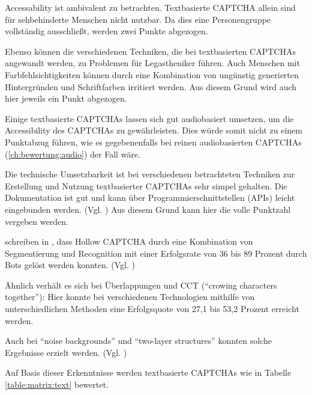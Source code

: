 Accessability ist ambivalent zu betrachten.
Textbasierte CAPTCHA allein sind für sehbehinderte Menschen nicht nutzbar. 
Da dies eine Personengruppe vollständig ausschließt, werden zwei Punkte abgezogen.

Ebenso können die verschiedenen Techniken, die bei textbasierten CAPTCHAs angewandt werden, zu Problemen für Legastheniker führen.
Auch Menschen mit Farbfehlsichtigkeiten können durch eine Kombination von ungünstig generierten Hintergründen und Schriftfarben irritiert werden.
Aus diesem Grund wird auch hier jeweils ein Punkt abgezogen.

Einige textbasierte CAPTCHAs lassen sich gut audiobasiert umsetzen, 
um die Accessibility des CAPTCHAs zu gewährleisten. 
Dies würde somit nicht zu einem Punktabzug führen, wie es gegebenenfalls bei reinen audiobasierten CAPTCHAs (\autoref{ch:bewertung:audio}) der Fall wäre.

Die technische Umsetzbarkeit ist bei verschiedenen betrachteten Techniken zur Erstellung und Nutzung textbasierter CAPTCHAs sehr simpel gehalten.
Die Dokumentation ist gut und kann über Programmierschnittstellen (APIs) leicht eingebunden werden. (Vgl. \cite{hcaptcha} \cite{phpcaptcha} \cite{reallysimplecaptcha})
Aus diesem Grund kann hier die volle Punktzahl vergeben werden.

\citeauthor{surveyofresearch} schreiben in , 
dass Hollow CAPTCHA durch eine Kombination von Segmentierung und Recognition %
mit einer Erfolgsrate von 36 bis 89 Prozent durch Bots gelöst werden konnten. (Vgl. \cite[p.76ff]{surveyofresearch}) %

Ähnlich verhält es sich bei Überlappungen und CCT (``crowing characters together''):
Hier konnte bei verschiedenen Technologien mithilfe von unterschiedlichen Methoden
eine Erfolgsquote von 27,1 bis 53,2 Prozent erreicht werden. \cite[p.76]{surveyofresearch} %

Auch bei ``noise backgrounds'' und ``two-layer structures'' konnten solche Ergebnisse erzielt werden. 
(Vgl. \cite[p.76]{surveyofresearch})

Auf Basis dieser Erkenntnisse werden textbasierte CAPTCHAs wie in Tabelle \ref{table:matrix:text} bewertet.


